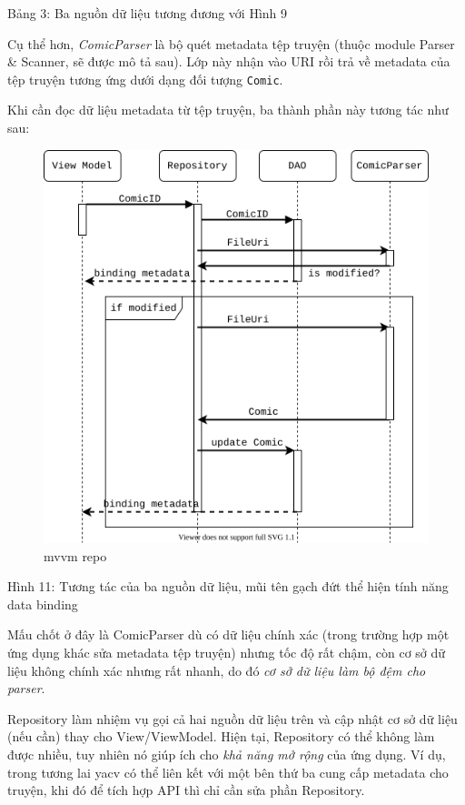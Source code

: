\documentclass[
]{article}
\begin{document}
Bảng 3: Ba nguồn dữ liệu tương đương với Hình 9

Cụ thể hơn, \emph{ComicParser} là bộ quét metadata tệp truyện (thuộc
module Parser \& Scanner, sẽ được mô tả sau). Lớp này nhận vào URI rồi
trả về metadata của tệp truyện tương ứng dưới dạng đối tượng
\texttt{Comic}.

Khi cần đọc dữ liệu metadata từ tệp truyện, ba thành phần này tương tác
như sau:

\begin{figure}
\centering
\includegraphics{../images/repo_mvvm_sequence.svg}
\caption{mvvm repo}
\end{figure}

Hình 11: Tương tác của ba nguồn dữ liệu, mũi tên gạch đứt thể hiện tính
năng data binding

Mấu chốt ở đây là ComicParser dù có dữ liệu chính xác (trong trường hợp
một ứng dụng khác sửa metadata tệp truyện) nhưng tốc độ rất chậm, còn cơ
sở dữ liệu không chính xác nhưng rất nhanh, do đó \emph{cơ sở dữ liệu
làm bộ đệm cho parser}.

Repository làm nhiệm vụ gọi cả hai nguồn dữ liệu trên và cập nhật cơ sở
dữ liệu (nếu cần) thay cho View/ViewModel. Hiện tại, Repository có thể
không làm được nhiều, tuy nhiên nó giúp ích cho \emph{khả năng mở rộng}
của ứng dụng. Ví dụ, trong tương lai yacv có thể liên kết với một bên
thứ ba cung cấp metadata cho truyện, khi đó để tích hợp API thì chỉ cần
sửa phần Repository.
\end{document}
